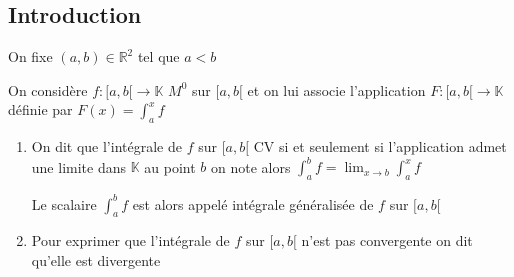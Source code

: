 \documentclass[11pt,hidelinks]{book}
\theoremstyle{mytheoremstyle}
\theoremstyle{mytheoremstyle}
\theoremstyle{mytheoremstyle}
\theoremstyle{mytheoremstyle}
\theoremstyle{mytheoremstyle}
\theoremstyle{mytheoremstyle}
\theoremstyle{mytheoremstyle}
\theoremstyle{mytheoremstyle}
\theoremstyle{myproblemstyle}
\def\mbb#1{\mathbb{#1}}
\def\bR{\mbb{R}}
\def\ib#1{\int_{a}^{b} #1}
\def\bK{\mbb{K}}
\def\ab{[a,b[}
\newcommand{\func}[3]{#1\colon#2\to#3}
\begin{document}
    \subsection{Introduction} On fixe $(a,b) \in \bR^2$ tel que $a < b$
    \begin{definition}
        On considère $\func{f}{\ab}{\bK}$ $M^0$ sur $\ab$ et on lui associe 
        l'application $\func{F}{\ab}{\bK}$ définie par $F(x) = \int_{a}^{x} f$ 
        \begin{enumerate}
        \item On dit que l'intégrale de $f$ sur $\ab$ CV si et seulement si 
        l'application admet une limite dans $\bK$ au point $b$ on note alors 
        $\ib{f} = \lim_{x \to b} \int_{a}^{x} f$
        \begin{rmq} 
        Le scalaire $\ib{f}$ est alors appelé intégrale généralisée de $f$ sur $\ab$ 
        \end{rmq} 

        \item Pour exprimer que l'intégrale de $f$ sur $\ab$ n'est pas convergente on dit qu'elle est 
        divergente 
    \end{enumerate}
    \end{definition}
\end{document}
